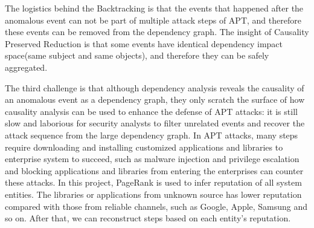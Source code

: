 The logistics behind the Backtracking is that the events that happened after the anomalous event can not be part of multiple attack steps of APT, and therefore these events can be removed from the dependency graph. The insight of Causality Preserved Reduction is that some events have identical dependency impact space(same subject and same objects), and therefore they can be safely aggregated.

The third challenge is that although dependency analysis reveals the causality of an anomalous event as a dependency graph, they only scratch the surface of how causality analysis can be used to enhance the defense of APT attacks: it is still slow and laborious for security analysts to filter unrelated events and recover the attack sequence from the large dependency graph. In APT attacks, many steps require downloading and installing customized applications and libraries to enterprise system to succeed, such as malware injection and privilege escalation\cite{apt,aptmalware,defendapt} and blocking applications and libraries from entering the enterprises can counter these attacks. 
In this project, PageRank\cite{pagerank} is used to infer reputation of all system entities. The libraries or applications from unknown source has lower reputation compared with those from reliable channels, such as Google, Apple, Samsung and so on. After that, we can reconstruct steps based on each entity's reputation.